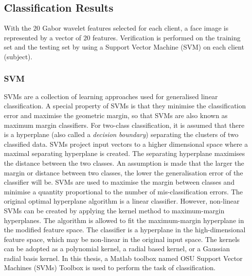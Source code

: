 \subsection{Classification Results}
\label{sec:faceveri:result2}
With the $20$ Gabor wavelet features selected for each client, a face image is represented by a vector of $20$ features. Verification is performed on the training set and the testing set by using a Support Vector Machine (SVM) \cite{Osuna1997} on each client (subject).

\subsubsection{SVM}
SVMs are a collection of learning approaches used for generalised linear classification. A special property of SVMs is that they minimise the classification error and maximise the geometric margin, so that SVMs are also known as maximum margin classifiers. For two-class classification, it is assumed that there is a hyperplane (also called a \textit{decision boundary}) separating the clusters of two classified data. SVMs project input vectors to a higher dimensional space where a maximal separating hyperplane is created. The separating hyperplane maximises the distance between the two classes. An assumption is made that the larger the margin or distance between two classes, the lower the generalisation error of the classifier will be. SVMs are used to maximise the margin between classes and minimise a quantity proportional to the number of mis-classification errors. The original optimal hyperplane algorithm is a linear classifier. However,  non-linear SVMs can be created by applying the kernel method \cite{Taylor2004} to maximum-margin hyperplanes. The algorithm is allowed to fit the maximum-margin hyperplane in the modified feature space. The classifier is a hyperplane in the high-dimensional feature space, which may be non-linear in the original input space. The kernels can be adopted as a polynomial kernel, a radial based kernel, or a Gaussian radial basis kernel. In this thesis, a Matlab toolbox named OSU Support Vector Machines (SVMs) Toolbox \cite{Ma2001} is used to perform the task of classification.

